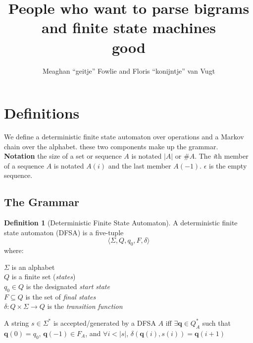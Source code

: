 \documentclass[12pt]{article}
\title{People who want to parse bigrams and finite state machines\\good}
\author{Meaghan ``geitje'' Fowlie and Floris ``konijntje'' van Vugt}
\theoremstyle{definition}
\newtheorem{definition}{Definition}[section]
\begin{document}
\maketitle

\section{Definitions}

\newcommand\STATES{\ensuremath{\mathbb{S}}}
\newcommand\OPS{\ensuremath{\mathbb{O}}}
\newcommand\BIGR{\ensuremath{\mathbb{B}}}
\newcommand\FSA{\textsc{FSA}}
\newcommand\PARSES{\ensuremath{\mathbb{P}}}
\newcommand\SC{\text{\textsc{sc}}}
\newcommand\TC{\text{\textsc{tc}}}
\newcommand\UC{\text{\textsc{uc}}}
\newcommand\BC{\text{\textsc{bc}}}
\newcommand\N{\ensuremath{\mathbb{N}}}
\newcommand\sg{\ensuremath{\Sigma}}
\newcommand\la{\ensuremath{\langle}}
\newcommand\ra{\ensuremath{\rangle}}
\newcommand\arr{\ensuremath{\rightarrow}}
\newcommand\emp{\ensuremath{\epsilon}}
\newcommand\op{\text{\textsl{op}}}
\newcommand\mg{\text{\textsl{mg}}}
\newcommand\cp{\text{\textsl{copy}}}
\newcommand\cl{\text{\textsl{clear}}}
\newcommand\ed{\text{\textsl{end}}}
\newcommand\expr{\text{\textsl{expr}}}
\newcommand\Lex{\text{\textsl{Lex}}}
\newcommand\fea[1]{\text{\texttt{#1}}}


\newcommand\der{\leftarrow}


We define a deterministic finite state automaton over operations and a Markov chain over the alphabet. these two components make up the grammar. \\

\noindent\textbf{Notation} the size of a set or sequence $A$ is notated $|A|$ or $\#A$. The \textit{i}th member of a sequence $A$ is notated $A(i)$ and the last member $A(-1)$. $\epsilon$ is the empty sequence.


\subsection{The Grammar}
\label{sec:grammar}



\begin{definition}[Deterministic Finite State Automaton]
  A deterministic finite state automaton (DFSA) is a five-tuple 
\[\la \sg, Q, q_0, F, \delta  \ra  \]
where:

\noindent $\sg$ is an alphabet\\
$Q$ is a finite set (\textit{states})\\
$q_0\in Q$ is the designated \textit{start state}\\
$F\subseteq Q$ is the set of \textit{final states}\\
$\delta: Q\times \sg \arr Q$ is the \textit{transition function} 

A string $s\in\sg^*$ is accepted/generated by a DFSA $A$ iff
$\exists \mathbf{q} \in Q_A^*$ such that $\mathbf{q}(0)=q_0$, $\mathbf{q}(-1)\in F_A$, and $\forall i<|s|$, $\delta(\mathbf{q}(i),s(i))=\mathbf{q}(i+1)$
\label{def:dfsa}
\end{definition}
\end{document}
